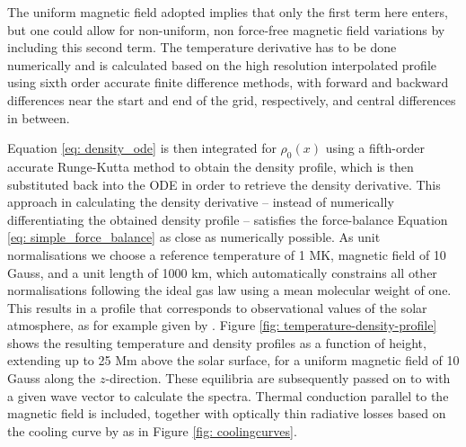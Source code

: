 The uniform magnetic field adopted implies that only the first term here enters, but one could allow for non-uniform, non force-free magnetic field variations by including this second term. The temperature derivative has to be done numerically and is calculated based on the high resolution interpolated profile using sixth order accurate finite difference methods, with forward and backward differences near the start and end of the grid, respectively, and central differences in between.


Equation \eqref{eq: density_ode} is then integrated for $\rho_0(x)$ using a fifth-order accurate Runge-Kutta method to obtain the density profile, which is then substituted back into the ODE in order to retrieve the density derivative. This approach in calculating the density derivative -- instead of numerically differentiating the obtained density profile -- satisfies the force-balance Equation \eqref{eq: simple_force_balance} as close as numerically possible. As unit normalisations we choose a reference temperature of 1 MK, magnetic field of 10 Gauss, and a unit length of 1000 km, which automatically constrains all other normalisations following the ideal gas law using a mean molecular weight of one. This results in a profile that corresponds to observational values of the solar atmosphere, as for example given by \citet{book_priest}. Figure \ref{fig: temperature-density-profile} shows the resulting temperature and density profiles as a function of height, extending up to 25 Mm above the solar surface, for a uniform magnetic field of 10 Gauss along the $z$-direction. These equilibria are subsequently passed on to {\legolas} with a given wave vector to calculate the spectra. Thermal conduction parallel to the magnetic field is included, together with optically thin radiative losses based on the {\spexdm} cooling curve by \citet{schure2009} as in Figure \ref{fig: coolingcurves}.


